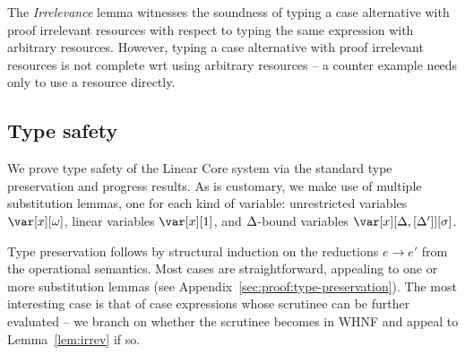 \documentclass[acmsmall,review,anonymous,screen]{acmart}
\begin{document}
\WHNFConvSoundness

The \emph{Irrelevance} lemma witnesses the soundness of typing a
case alternative with proof irrelevant resources with respect to
typing the same expression with arbitrary resources. However, typing
a case alternative with proof irrelevant resources is not complete wrt using
arbitrary resources -- a counter example needs only to use a resource
directly.


\subsection{Type safety\label{sec:type-safety-meta}}

We prove type safety of the Linear Core system via the standard type
preservation and progress results. As is customary, we make use of multiple
substitution lemmas, one for each kind of variable: unrestricted variables
$\xo$, linear variables $\xl$, and $\Delta$-bound variables $\xD$.


\TypePreservationTheorem
%
\ProgressTheorem
%
Type preservation
follows by structural induction on the reductions $e \longrightarrow
e'$ from the operational semantics. Most cases are straightforward, appealing to one or more
substitution lemmas (see Appendix~\ref{sec:proof:type-preservation}). The most
interesting case is that of case expressions whose scrutinee can be further
evaluated -- we branch on whether the scrutinee becomes in WHNF and appeal to Lemma~\ref{lem:irrev} if so.
%
%
%
%
\end{document}
